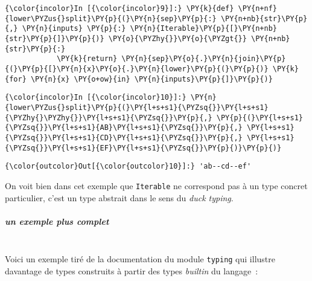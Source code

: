     \begin{Verbatim}[commandchars=\\\{\}]
{\color{incolor}In [{\color{incolor}9}]:} \PY{k}{def} \PY{n+nf}{lower\PYZus{}split}\PY{p}{(}\PY{n}{sep}\PY{p}{:} \PY{n+nb}{str}\PY{p}{,} \PY{n}{inputs} \PY{p}{:} \PY{n}{Iterable}\PY{p}{[}\PY{n+nb}{str}\PY{p}{]}\PY{p}{)} \PY{o}{\PYZhy{}}\PY{o}{\PYZgt{}} \PY{n+nb}{str}\PY{p}{:}
            \PY{k}{return} \PY{n}{sep}\PY{o}{.}\PY{n}{join}\PY{p}{(}\PY{p}{[}\PY{n}{x}\PY{o}{.}\PY{n}{lower}\PY{p}{(}\PY{p}{)} \PY{k}{for} \PY{n}{x} \PY{o+ow}{in} \PY{n}{inputs}\PY{p}{]}\PY{p}{)}
\end{Verbatim}


    \begin{Verbatim}[commandchars=\\\{\}]
{\color{incolor}In [{\color{incolor}10}]:} \PY{n}{lower\PYZus{}split}\PY{p}{(}\PY{l+s+s1}{\PYZsq{}}\PY{l+s+s1}{\PYZhy{}\PYZhy{}}\PY{l+s+s1}{\PYZsq{}}\PY{p}{,} \PY{p}{(}\PY{l+s+s1}{\PYZsq{}}\PY{l+s+s1}{AB}\PY{l+s+s1}{\PYZsq{}}\PY{p}{,} \PY{l+s+s1}{\PYZsq{}}\PY{l+s+s1}{CD}\PY{l+s+s1}{\PYZsq{}}\PY{p}{,} \PY{l+s+s1}{\PYZsq{}}\PY{l+s+s1}{EF}\PY{l+s+s1}{\PYZsq{}}\PY{p}{)}\PY{p}{)}
\end{Verbatim}


\begin{Verbatim}[commandchars=\\\{\}]
{\color{outcolor}Out[{\color{outcolor}10}]:} 'ab--cd--ef'
\end{Verbatim}
            
    On voit bien dans cet exemple que \texttt{Iterable} ne correspond pas à
un type concret particulier, c'est un type abstrait dans le sens du
\emph{duck typing}.

    \hypertarget{un-exemple-plus-complet}{%
\subparagraph{un exemple plus complet\\\\}\label{un-exemple-plus-complet}}

    Voici un exemple tiré de la documentation du module \texttt{typing} qui
illustre davantage de types construits à partir des types \emph{builtin}
du langage~:

